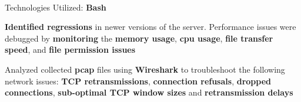 \documentclass[]{deedy-resume-openfont}
\begin{document}
\begin{minipage}[t]{0.66\textwidth}
\\
\begin{tightemize}
\item Technologies Utilized: \textbf{Bash}
\item \textbf{Identified regressions} in newer versions of the server. Performance issues were debugged by \textbf{monitoring} the \textbf{memory usage}, \textbf{cpu usage}, \textbf{file transfer speed}, and \textbf{file permission issues}
\item Analyzed collected \textbf{pcap} files using \textbf{Wireshark} to troubleshoot the following network issues: \textbf{TCP retransmissions}, \textbf{connection refusals}, \textbf{dropped connections}, \textbf{sub-optimal TCP window sizes} and \textbf{retransmission delays}
\end{tightemize}
\sectionsep





\end{minipage}
\end{document}
